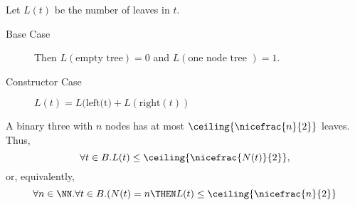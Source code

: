 \documentclass[11pt]{scrartcl}
\begin{document}
\begin{example}
Let $L(t)$ be the number of leaves in $t$.
  \begin{description}
  \item[Base Case] \hfill

    Then $L(\text{empty tree}) = 0$ and $L(\text{one node tree }) = 1$.
    
  \item[Constructor Case] \hfill

    $L(t) = L(\text{left(t)} + L(\text{right}(t))$
  \end{description}
\end{example}

\begin{theorem}
  A binary three with $n$ nodes has at most $\ceiling{\nicefrac{n}{2}}$ leaves. Thus,
  \begin{equation*}
    \forall t \in B.L(t) \leq \ceiling{\nicefrac{N(t)}{2}}, 
  \end{equation*}
  or, equivalently,
  \begin{equation*}
    \forall n \in \NN. \forall t \in B.(N(t) = n \THEN L(t)\leq \ceiling{\nicefrac{n}{2}}
  \end{equation*}
\end{theorem}
\end{document}
